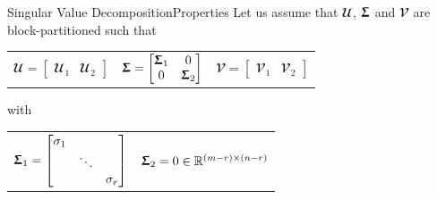 \documentclass[usenames,dvipsnames,svgnames,10pt,aspectratio=169]{beamer}
\begin{document}
\begin{frame}[t, c]{Singular Value Decomposition}{Properties}
	Let us assume that $\mathbfcal{U}$, $\boldsymbol{\Upsigma}$ and $\mathbfcal{V}$ are block-partitioned such that

	\begin{center}
		\begin{tabular}{ccc}
			$\mathbfcal{U} = \begin{bmatrix} \mathbfcal{U}_1 & \mathbfcal{U}_2 \end{bmatrix}$ & $\boldsymbol{\Upsigma} = \begin{bmatrix} \boldsymbol{\Upsigma}_1 & 0 \\ 0 & \boldsymbol{\Upsigma}_2 \end{bmatrix}$ & $\mathbfcal{V} = \begin{bmatrix} \mathbfcal{V}_1 & \mathbfcal{V}_2 \end{bmatrix}$
		\end{tabular}
	\end{center}
	with
	\begin{center}
		\begin{tabular}{cc}
			$\boldsymbol{\Upsigma}_1 = \begin{bmatrix} \sigma_1 & ~ & ~ \\ ~ & \ddots & ~ \\ ~ & ~ & \sigma_r \end{bmatrix}$ & $\boldsymbol{\Upsigma}_2 = 0 \in \mathbb{R}^{(m-r) \times (n-r)}$
		\end{tabular}
	\end{center}

	\vspace{1cm}
\end{frame}
\end{document}
